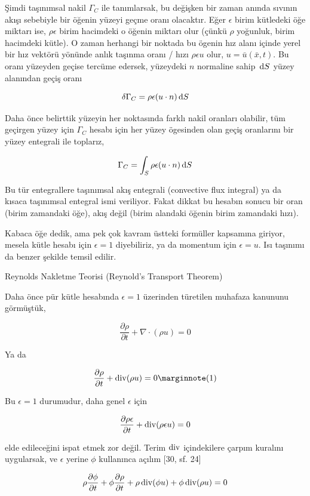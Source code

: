 \documentclass[12pt,fleqn]{article}\usepackage{../../common}
\begin{document}
Şimdi taşınımsal nakil $\Gamma_C$ ile tanımlarsak, bu değişken bir zaman anında
sıvının akışı sebebiyle bir öğenin yüzeyi geçme oranı olacaktır. Eğer $\epsilon$
birim kütledeki öğe miktarı ise, $\rho \epsilon$ birim hacimdeki o öğenin
miktarı olur (çünkü $\rho$ yoğunluk, birim hacimdeki kütle). O zaman herhangi
bir noktada bu ögenin hız alanı içinde yerel bir hız vektörü yönünde anlık
taşınma oranı / hızı $\rho \epsilon u$ olur, $u = \bar{u}(\bar{x},t)$. Bu
oranı yüzeyden geçise tercüme edersek, yüzeydeki $n$ normaline sahip $\,\mathrm{d} S$
yüzey alanından geçiş oranı

$$
\delta \Gamma_C = \rho \epsilon (u \cdot n) \,\mathrm{d} S
$$

Daha önce belirttik yüzeyin her noktasında farklı nakil oranları olabilir,
tüm geçirgen yüzey için $\Gamma_C$ hesabı için her yüzey ögesinden olan geçiş
oranlarını bir yüzey entegrali ile toplarız,

$$
\Gamma_C = \int_S \rho \epsilon (u \cdot n) \,\mathrm{d} S
$$

Bu tür entegrallere taşınımsal akış entegrali (convective flux integral) ya da
kısaca taşınımsal entegral ismi veriliyor. Fakat dikkat bu hesabın sonucu bir
oran (birim zamandaki öğe), akış değil (birim alandaki öğenin birim zamandaki
hızı).

Kabaca öğe dedik, ama pek çok kavram üstteki formüller kapsamına giriyor, mesela
kütle hesabı için $\epsilon = 1$ diyebiliriz, ya da momentum için
$\epsilon = u$. Isı taşınımı da benzer şekilde temsil edilir.

Reynolds Nakletme Teorisi (Reynold's Transport Theorem)

Daha önce pür kütle hesabında $\epsilon = 1$ üzerinden türetilen muhafaza
kanununu görmüştük,

$$
\frac{\partial \rho}{\partial t} + \nabla \cdot (\rho u ) = 0
$$

Ya da 

$$
\frac{\partial \rho}{\partial t} + \bdiv (\rho u ) = 0
\mlabel{1}
$$

Bu $\epsilon = 1$ durumudur, daha genel $\epsilon$ için

$$
\frac{\partial \rho \epsilon}{\partial t} + \operatorname{div} (\rho \epsilon u ) = 0
$$

elde edileceğini ispat etmek zor değil. Terim $\operatorname{div}$ içindekilere çarpım
kuralını uygularsak, ve $\epsilon$ yerine $\phi$ kullanınca açılım [30, sf. 24]

$$
\rho \frac{\partial \phi}{\partial t} +
\phi \frac{\partial \rho}{\partial t} + 
\rho \operatorname{div} (\phi u ) +
\phi \operatorname{div} (\rho u ) = 0
$$
\end{document}
